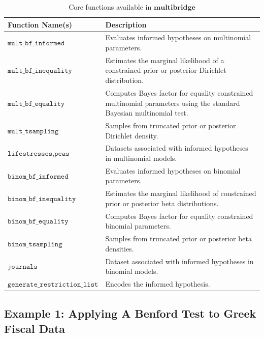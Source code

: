 \documentclass[
  english,
  man,floatsintext]{apa6}
\begin{document}
\begin{table}
\caption {Core functions available in $\textbf{multibridge}$}
\label{table:core_functions}
\begin{center}
\begin{tabular}{p{5cm}p{11cm}}
        \toprule
Function Name(s) & Description \\\midrule
$\texttt{mult\_bf\_informed}$ & Evaluates informed hypotheses on multinomial parameters.  \\
$\texttt{mult\_bf\_inequality}$ & Estimates the marginal likelihood of a constrained prior or posterior Dirichlet distribution.  \\
$\texttt{mult\_bf\_equality}$ & Computes Bayes factor for equality constrained multinomial parameters using the standard Bayesian multinomial test.  \\
$\texttt{mult\_tsampling}$ & Samples from truncated prior or posterior Dirichlet density.\\
$ \texttt{lifestresses}, \texttt{peas}$ & Datasets associated with informed hypotheses in multinomial models.\\\midrule
$\texttt{binom\_bf\_informed}$ & Evaluates informed hypotheses on binomial parameters.  \\
$\texttt{binom\_bf\_inequality}$ & Estimates the marginal likelihood of constrained prior or posterior beta distributions.\\
$\texttt{binom\_bf\_equality}$ & Computes Bayes factor for equality constrained binomial parameters.  \\
$\texttt{binom\_tsampling}$ & Samples from truncated prior or posterior beta densities.\\
$ \texttt{journals}$ & Dataset associated with informed hypotheses in binomial models.\\\midrule
$ \texttt{generate\_restriction\_list}$ & Encodes the informed hypothesis.\\
\bottomrule
\end{tabular}
\end{center}
\end{table}

\hypertarget{example-1-applying-a-benford-test-to-greek-fiscal-data}{%
\subsection{Example 1: Applying A Benford Test to Greek Fiscal Data}\label{example-1-applying-a-benford-test-to-greek-fiscal-data}}
\end{document}
